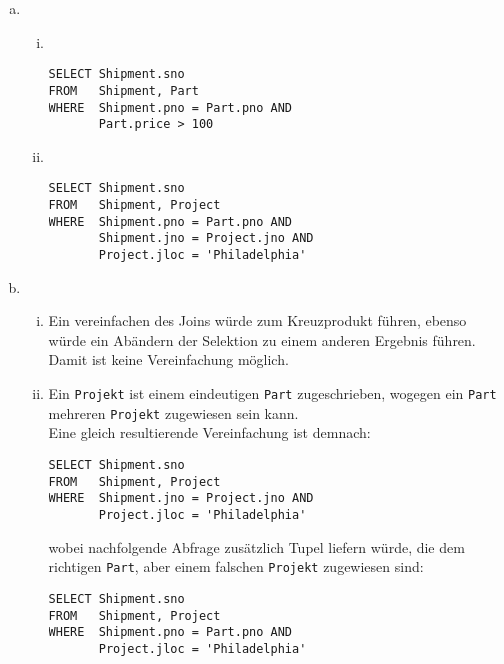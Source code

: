 \documentclass{uni_tue_template}
\newcommand{\code}[1]{\texttt{{\footnotesize #1}}}
\begin{document}
	\item
	\begin{enumerate}[(a)]
		\item \hfill\\
		\begin{enumerate}[i.]
			\item \hfill\\
\begin{lstlisting}
SELECT Shipment.sno
FROM   Shipment, Part
WHERE  Shipment.pno = Part.pno AND
       Part.price > 100
\end{lstlisting}
			\item \hfill\\
\begin{lstlisting}
SELECT Shipment.sno
FROM   Shipment, Project
WHERE  Shipment.pno = Part.pno AND
       Shipment.jno = Project.jno AND
       Project.jloc = 'Philadelphia'
\end{lstlisting}
		\end{enumerate}
		\item \hfill\\
		\begin{enumerate}[i.]
			\item Ein vereinfachen des Joins würde zum Kreuzprodukt führen, ebenso würde ein Abändern der Selektion zu einem anderen Ergebnis führen.\\ Damit ist keine Vereinfachung möglich.
			\item Ein \code{Projekt} ist einem eindeutigen \code{Part} zugeschrieben, wogegen ein \code{Part} mehreren \code{Projekt} zugewiesen sein kann.\\
			Eine gleich resultierende Vereinfachung ist demnach:\\
\begin{lstlisting}
SELECT Shipment.sno
FROM   Shipment, Project
WHERE  Shipment.jno = Project.jno AND
       Project.jloc = 'Philadelphia'
\end{lstlisting}
wobei nachfolgende Abfrage zusätzlich Tupel liefern würde, die dem richtigen \code{Part}, aber einem falschen \code{Projekt} zugewiesen sind:\\
\begin{lstlisting}
SELECT Shipment.sno
FROM   Shipment, Project
WHERE  Shipment.pno = Part.pno AND
       Project.jloc = 'Philadelphia'
\end{lstlisting}
		\end{enumerate}
	\end{enumerate}
	\newpage
	\item
\end{document}
